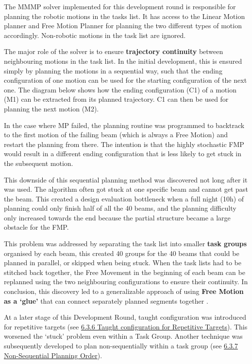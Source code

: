 The MMMP solver implemented for this development round is responsible for planning the robotic motions in the tasks list. It has access to the Linear Motion planner and Free Motion Planner for planning the two different types of motion accordingly. Non-robotic motions in the task list are ignored.




The major role of the solver is to ensure \textbf{trajectory continuity} between neighbouring motions in the task list. In the initial development, this is ensured simply by planning the motions in a sequential way, such that the ending configuration of one motion can be used for the starting configuration of the next one. The diagram below shows how the ending configuration (C1) of a motion (M1) can be extracted from its planned trajectory. C1 can then be used for planning the next motion (M2).




In the case where MP failed, the planning routine was programmed to backtrack to the first motion of the failing beam (which is always a Free Motion) and restart the planning from there. The intention is that the highly stochastic FMP would result in a different ending configuration that is less likely to get stuck in the subsequent motion.

This downside of this sequential planning method was discovered not long after it was used. The algorithm often got stuck at one specific beam and cannot get past the beam. This created a design evaluation bottleneck when a full night (10h) of planning could only finish half of all the 40 beams, and the planning difficulty only increased towards the end because the partial structure became a large obstacle for the FMP.

This problem was addressed by separating the task list into smaller \textbf{task groups }organised by each beam, this created 40 groups for the 40 beams that could be planned in parallel, or skipped when being stuck. When the task lists had to be stitched back together, the Free Movement in the beginning of each beam can be replanned using the two neighbouring configurations to ensure their continuity. In conclusion, this discovery led to a generalizable approach of using \textbf{Free Motion as a ‘glue’} that can connect separately planned segments together \parencite{lozanoperezConstraintBasedMethodSolving2014}.

At a later stage of this Development Round, taught configuration was introduced for repetitive targets (see \ul{6.3.6 Taught configuration for Repetitive Targets}). This worsened the ‘stuck’ problem even within a Task Group. Another technique was subsequently developed to plan non-sequentially within a task group (see \ul{6.3.7 Non-Sequential Planning Order}).

